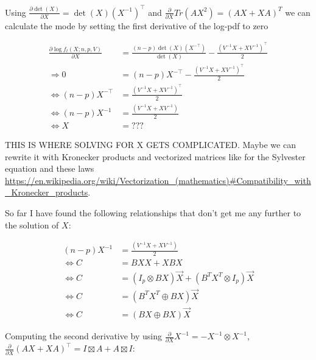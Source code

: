 Using $\frac{\partial \det(X)}{\partial X} = \det(X)(X^{-1})^\top$ and $\frac{\partial}{\partial X} Tr(AX^2) = (AX + XA)^T$ we can calculate the mode by setting the first derivative of the log-pdf to zero

\begin{align*}
\frac{\partial \log f_t(X; n,p,V)}{\partial X} &= \frac{(n-p)\det(X)(X^{-\top})}{\det(X)} - \frac{(V^{-1}X + XV^{-1})^\top}{2} \\
\Rightarrow 0 &= (n-p)X^{-\top} - \frac{(V^{-1}X + XV^{-1})^\top}{2} \\
\Leftrightarrow  (n-p)X^{-\top} &=  \frac{(V^{-1}X + XV^{-1})^\top}{2} \\
\Leftrightarrow  (n-p)X^{-1} &=  \frac{(V^{-1}X + XV^{-1})}{2} \\
\Leftrightarrow X &= ???
\end{align*}

THIS IS WHERE SOLVING FOR X GETS COMPLICATED. Maybe we can rewrite it with Kronecker products and vectorized matrices like for the Sylvester equation and these laws \url{https://en.wikipedia.org/wiki/Vectorization_(mathematics)#Compatibility_with_Kronecker_products}.

So far I have found the following relationships that don't get me any further to the solution of $X$:

\begin{align*}
(n-p)X^{-1} &=  \frac{(V^{-1}X + XV^{-1})}{2} \\
\Leftrightarrow C &= BXX + XBX \\
\Leftrightarrow C &= (I_p \otimes BX)\vec{X} + (B^TX^T \otimes I_p)\vec{X} \\
\Leftrightarrow C &= (B^TX^T \oplus BX)\vec{X} \\
\Leftrightarrow C &= (BX \oplus BX)\vec{X}
\end{align*}

Computing the second derivative by using $\frac{\partial}{\partial X}X^{-1} = -X^{-1} \otimes X^{-1}$, $\frac{\partial}{\partial X} (AX + XA)^\top = I \boxtimes A + A \boxtimes I$:


